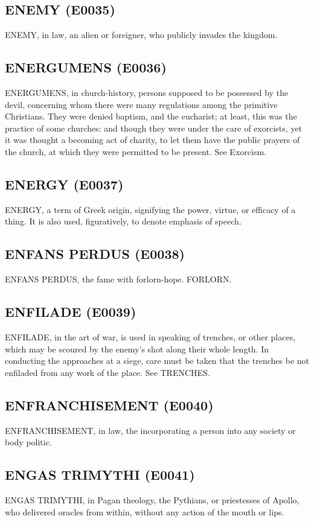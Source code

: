 \documentclass{article}
\begin{document}
\subsection*{ENEMY (E0035)}
ENEMY, in law, an alien or foreigner, who publicly invades the kingdom.

\subsection*{ENERGUMENS (E0036)}
ENERGUMENS, in church-history, persons supposed to be possessed by the devil, concerning whom there were many regulations among the primitive Christians. They were denied baptism, and the eucharist; at least, this was the practice of some churches: and though they were under the care of exorcists, yet it was thought a becoming act of charity, to let them have the public prayers of the church, at which they were permitted to be present. See Exorcism.

\subsection*{ENERGY (E0037)}
ENERGY, a term of Greek origin, signifying the power, virtue, or efficacy of a thing. It is also used, figuratively, to denote emphasis of speech.

\subsection*{ENFANS PERDUS (E0038)}
ENFANS PERDUS, the fame with forlorn-hope.
FORLORN.

\subsection*{ENFILADE (E0039)}
ENFILADE, in the art of war, is used in speaking of trenches, or other places, which may be scoured by the enemy's shot along their whole length. In conducting the approaches at a siege, care must be taken that the trenches be not enfiladed from any work of the place. See TRENCHES.

\subsection*{ENFRANCHISEMENT (E0040)}
ENFRANCHISEMENT, in law, the incorporating a person into any society or body politic.

\subsection*{ENGAS TRIMYTHI (E0041)}
ENGAS TRIMYTHI, in Pagan theology, the Pythians, or priestesses of Apollo, who delivered oracles from within, without any action of the mouth or lips.
\end{document}
